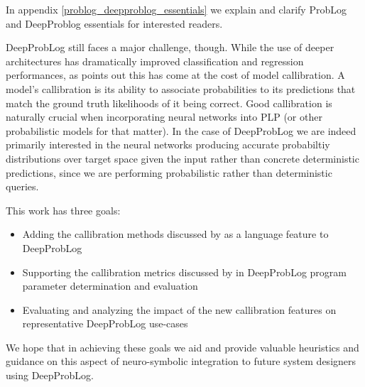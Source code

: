 In appendix \ref{problog_deepproblog_essentials} we explain and clarify ProbLog and DeepProblog essentials for interested readers. \par
DeepProbLog still faces a major challenge, though. While the use of deeper architectures has dramatically improved classification and regression performances, as \cite{guo2017calibration} points out this has come at the cost of model callibration. A model's callibration is its ability to associate probabilities to its predictions that match the ground truth likelihoods of it being correct. Good callibration is naturally crucial when incorporating neural networks into PLP (or other probabilistic models for that matter). In the case of DeepProbLog we are indeed primarily interested in the neural networks producing accurate probabiltiy distributions over target space given the input rather than concrete deterministic predictions, since we are performing probabilistic rather than deterministic queries. \par
This work has three goals:
\begin{itemize}
  \item Adding the callibration methods discussed by \cite{guo2017calibration} as a language feature to DeepProbLog
  \item Supporting the callibration metrics discussed by \cite{guo2017calibration} in DeepProbLog program parameter determination and evaluation
  \item Evaluating and analyzing the impact of the new callibration features on representative DeepProbLog use-cases
\end{itemize}
We hope that in achieving these goals we aid and provide valuable heuristics and guidance on this aspect of neuro-symbolic integration to future system designers using DeepProbLog.